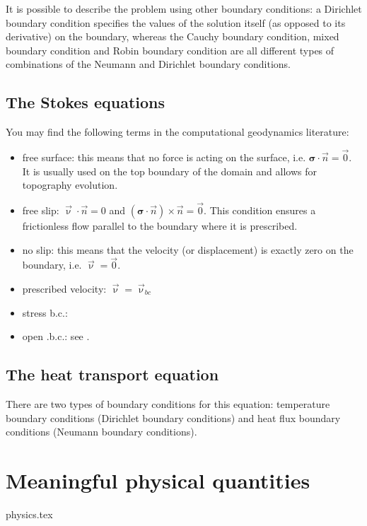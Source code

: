 It is possible to describe the problem using other boundary conditions: 
a Dirichlet boundary condition specifies the values of the solution itself 
(as opposed to its derivative) on the boundary, whereas the Cauchy boundary condition, 
mixed boundary condition and Robin boundary condition are all different types of combinations 
of the Neumann and Dirichlet boundary conditions.


\subsection{The Stokes equations}

You may find the following terms in the computational geodynamics literature:

\begin{itemize}
\item { free surface}: this means that no force is acting on the surface, i.e. ${\bm \sigma}\cdot {\vec n}={\vec 0}$. It is usually used on the top boundary of the domain and allows for topography evolution.
\item { free slip}: ${\vec \upnu}\cdot \vec n = 0$ and $({\bm \sigma}\cdot{\vec n})\times {\vec n}={\vec 0}$. This condition ensures a frictionless flow parallel to the boundary where it is prescribed.
\item { no slip}: this means that the velocity (or displacement) is exactly zero on the boundary, i.e. ${\vec \upnu}={\vec 0}$.
\item { prescribed velocity}: ${\vec \upnu}={\vec \upnu}_{bc}$
\item stress b.c.: 
\item open .b.c.: see . 
\end{itemize}

\subsection{The heat transport equation}

There are two types of boundary conditions for this equation: temperature boundary conditions (Dirichlet boundary conditions) and heat flux boundary conditions (Neumann boundary conditions). 

\newpage
\section{Meaningful physical quantities}
\begin{flushright} {\tiny {\color{gray} physics.tex}} \end{flushright}

